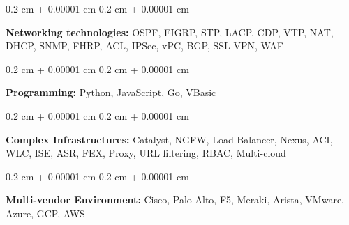 \documentclass[10pt, a4paper]{article}
\newenvironment{onecolentry}{
    \begin{adjustwidth}{
        0.2 cm + 0.00001 cm
    }{
        0.2 cm + 0.00001 cm
    }
}{
    \end{adjustwidth}
} %
\begin{document}
        \vspace{0.2 cm}

        \begin{onecolentry}
            \textbf{Networking technologies:} OSPF, EIGRP, STP, LACP, CDP, VTP, NAT, DHCP, SNMP, FHRP, ACL, IPSec, vPC, BGP, SSL VPN, WAF
        \end{onecolentry}

        \vspace{0.2 cm}

        \begin{onecolentry}
            \textbf{Programming:} Python, JavaScript, Go, VBasic
        \end{onecolentry}

        \vspace{0.2 cm}

        \begin{onecolentry}
            \textbf{Complex Infrastructures:} Catalyst, NGFW, Load Balancer, Nexus, ACI, WLC, ISE, ASR, FEX, Proxy, URL filtering, RBAC, Multi-cloud
        \end{onecolentry}

        \vspace{0.2 cm}

        \begin{onecolentry}
            \textbf{Multi-vendor Environment:} Cisco, Palo Alto, F5, Meraki, Arista, VMware, Azure, GCP, AWS
        \end{onecolentry}


    
\end{document}
